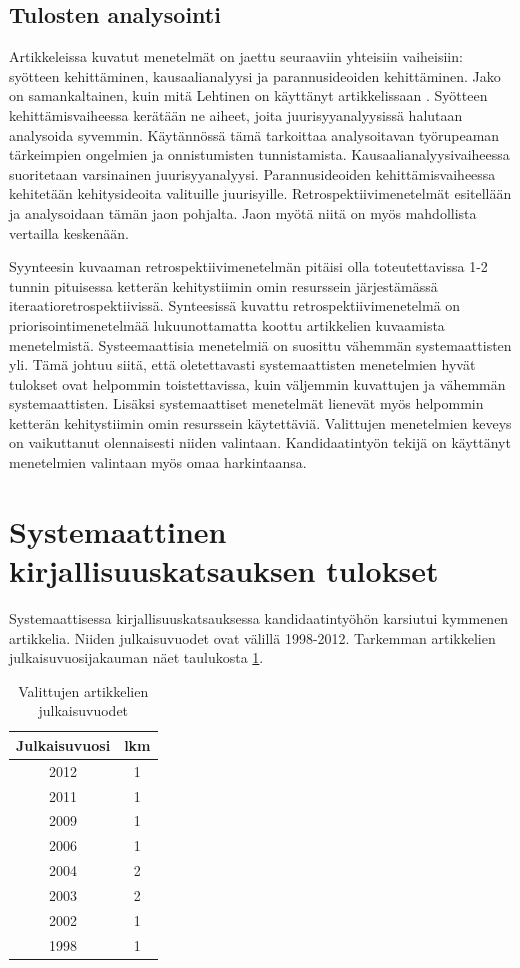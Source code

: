 \subsection{Tulosten analysointi}
Artikkeleissa kuvatut menetelmät on jaettu seuraaviin yhteisiin vaiheisiin: syötteen kehittäminen, kausaalianalyysi ja parannusideoiden kehittäminen. Jako on samankaltainen, kuin mitä Lehtinen on käyttänyt artikkelissaan \citep{Lehtinen2011}. Syötteen kehittämisvaiheessa kerätään ne aiheet, joita juurisyyanalyysissä halutaan analysoida syvemmin. Käytännössä tämä tarkoittaa analysoitavan työrupeaman tärkeimpien ongelmien ja onnistumisten tunnistamista. Kausaalianalyysivaiheessa suoritetaan varsinainen juurisyyanalyysi. Parannusideoiden kehittämisvaiheessa kehitetään kehitysideoita valituille juurisyille. Retrospektiivimenetelmät esitellään ja analysoidaan tämän jaon pohjalta. Jaon myötä niitä on myös mahdollista vertailla keskenään.

Syynteesin kuvaaman retrospektiivimenetelmän pitäisi olla toteutettavissa 1-2 tunnin pituisessa ketterän kehitystiimin omin resurssein järjestämässä iteraatioretrospektiivissä. Synteesissä kuvattu retrospektiivimenetelmä on priorisointimenetelmää lukuunottamatta koottu artikkelien kuvaamista menetelmistä. Systeemaattisia menetelmiä on suosittu vähemmän systemaattisten yli. Tämä johtuu siitä, että oletettavasti systemaattisten menetelmien hyvät tulokset ovat helpommin toistettavissa, kuin väljemmin kuvattujen ja vähemmän systemaattisten. Lisäksi systemaattiset menetelmät lienevät myös helpommin ketterän kehitystiimin omin resurssein käytettäviä. Valittujen menetelmien keveys on vaikuttanut olennaisesti niiden valintaan. Kandidaatintyön tekijä on käyttänyt menetelmien valintaan myös omaa harkintaansa.

\section{Systemaattinen kirjallisuuskatsauksen tulokset}
Systemaattisessa kirjallisuuskatsauksessa kandidaatintyöhön karsiutui kymmenen artikkelia. Niiden julkaisuvuodet ovat välillä 1998-2012. Tarkemman artikkelien julkaisuvuosijakauman näet taulukosta \ref{tab:julkaisuvuodet}.
\begin{table}
    \begin{tabular}{|c|c|}
        \hline
        \textbf{Julkaisuvuosi} & \textbf{lkm} \\ \hline
	2012	& 1 \\ \hline
	2011	& 1 \\ \hline
	2009	& 1 \\ \hline
	2006	& 1 \\ \hline
	2004	& 2 \\ \hline
	2003	& 2 \\ \hline
	2002	& 1 \\ \hline
	1998	& 1 \\ \hline
    \end{tabular}
    \caption{Valittujen artikkelien julkaisuvuodet}
    \label{tab:julkaisuvuodet}
\end{table}

